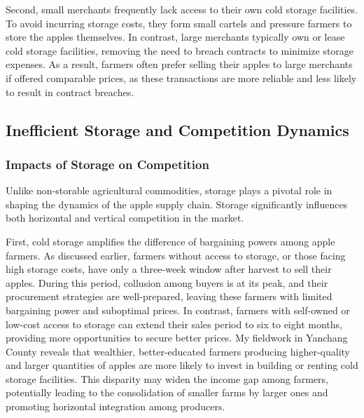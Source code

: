 Second, small merchants frequently lack access to their own cold storage facilities. To avoid incurring storage costs, they form small cartels and pressure farmers to store the apples themselves. In contrast, large merchants typically own or lease cold storage facilities, removing the need to breach contracts to minimize storage expenses. As a result, farmers often prefer selling their apples to large merchants if offered comparable prices, as these transactions are more reliable and less likely to result in contract breaches.







\subsection{Inefficient Storage and Competition Dynamics}


\subsubsection{Impacts of Storage on Competition}
\noindent Unlike non-storable agricultural commodities, storage plays a pivotal role in shaping the dynamics of the apple supply chain. Storage significantly influences both horizontal and vertical competition in the market.

First, cold storage amplifies the difference of bargaining powers among apple farmers. As discussed earlier, farmers without access to storage, or those facing high storage costs, have only a three-week window after harvest to sell their apples. During this period, collusion among buyers is at its peak, and their procurement strategies are well-prepared, leaving these farmers with limited bargaining power and suboptimal prices. In contrast, farmers with self-owned or low-cost access to storage can extend their sales period to six to eight months, providing more opportunities to secure better prices. My fieldwork in Yanchang County reveals that wealthier, better-educated farmers producing higher-quality and larger quantities of apples are more likely to invest in building or renting cold storage facilities. This disparity may widen the income gap among farmers, potentially leading to the consolidation of smaller farms by larger ones and promoting horizontal integration among producers.

